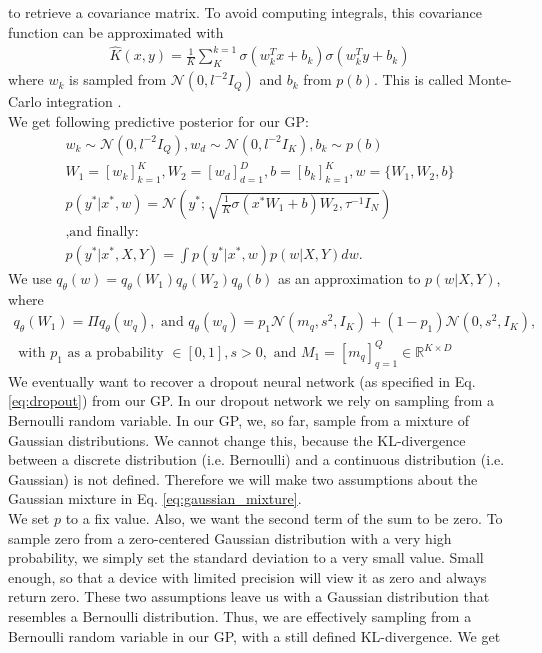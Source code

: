 \documentclass[a4paper,cleardoubleempty,BCOR1cm, 11pt]{report}
\begin{document}
to retrieve a covariance matrix. To avoid computing integrals, this covariance function can be approximated with
\begin{align*}
	\hat{K}(x,y) = \frac{1}{K} \sum_{K}^{k=1} \sigma(w^T_k x + b_k)\sigma(w^T_k y + b_k)
\end{align*}
where $w_k$ is sampled from $\mathcal{N}(0, l^{-2}I_Q)$ and $b_k$ from $p(b)$. This is called Monte-Carlo integration \cite{metropolis1949monte}.\\
We get following predictive posterior for our GP:
\begin{align*}
w_k \sim \mathcal{N}(0, l^{-2}I_Q), w_d \sim \mathcal{N}(0, l^{-2} I_K), b_k \sim p(b)\\
W_1 = \left[ w_k \right]^{K}_{k=1}, W_2 = \left[ w_d \right]^D_{d=1}, b = \left[ b_k \right]^K_{k=1}, w = \lbrace W_1, W_2, b \rbrace\\
p(y^*|x^*, w) = \mathcal{N} \left( y^*; \sqrt{\frac{1}{K}\sigma(x^* W_1 + b)W_2, \tau^{-1}I_N}\right)\\
\text{,and finally:}\hspace{150pt}\\
p(y^*|x^*, X,Y) = \int p(y^*|x^*, w)p(w|X,Y)dw.
\end{align*}
We use $q_{\theta}(w) = q_{\theta}(W_1)q_{\theta}(W_2)q_{\theta}(b)$ as an approximation to $p(w|X,Y)$, where
\begin{align}\label{eq:gaussian_mixture}
q_{\theta}(W_1) = \Pi q_{\theta}(w_q), \text{ and } q_{\theta}(w_q) = p_1\mathcal{N}(m_q, s^2, I_K) + (1-p_1) \mathcal{N}(0, s^2, I_K),\\
\text{ with } p_1 \text{ as a probability }\in \left[ 0, 1\right], s > 0, \text{ and }M_1 = \left[ m_q \right]^Q_{q=1} \in \mathbb{R}^{K\times D}
\end{align}
We eventually want to recover a dropout neural network (as specified in Eq. \ref{eq:dropout}) from our GP. In our dropout network we rely on sampling from a Bernoulli random variable. In our GP, we, so far, sample from a mixture of Gaussian distributions. We cannot change this, because the KL-divergence between a discrete distribution (i.e. Bernoulli) and a continuous distribution (i.e. Gaussian) is not defined. Therefore we will make two assumptions about the Gaussian mixture in Eq. \ref{eq:gaussian_mixture}.\\
We set $p$ to a fix value. Also, we want the second term of the sum to be zero. To sample zero from a zero-centered Gaussian distribution with a very high probability, we simply set the standard deviation to a very small value. Small enough, so that a device with limited precision will view it as zero and always return zero. These two assumptions leave us with a Gaussian distribution that resembles a Bernoulli distribution. Thus, we are effectively sampling from a Bernoulli random variable in our GP, with a still defined KL-divergence. We get
\end{document}
